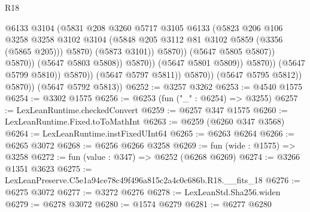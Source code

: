 \begin{lexlean}{R18}
\begin{coremodule}
                                              @6133
                                              @3104
                                              (@5831
                                                @208
                                                @3260
                                                @5717
                                                @3105
                                                @6133
                                                (@5823
                                                  @206
                                                  @106
                                                  @3258
                                                  @3258
                                                  @3102
                                                  @3104
                                                  (@5848
                                                    @205
                                                    @3112
                                                    @81
                                                    @3102
                                                    @5859
                                                    (@3356 (@5865 @205)))
                                                  @5870)
                                                (@5873 @3101))
                                              @5870))
                                          (@5647 @5805 @5807))
                                        @5870))
                                    (@5647 @5803 @5808))
                                  @5870))
                              (@5647 @5801 @5809))
                            @5870))
                        (@5647 @5799 @5810))
                      @5870))
                  (@5647 @5797 @5811))
                @5870))
            (@5647 @5795 @5812))
          @5870))
      (@5647 @5792 @5813))
@6252 := @3257 @3262
@6253 := @4540 @1575
@6254 := @3302 @1575
@6256 := @6253 (fun ("_" : @6254) => @3255)
@6257 := LexLeanRuntime.checkedConvert
@6259 := @6257 @347 @1575
@6260 := LexLeanRuntime.Fixed.toToMathInt
@6263 := @6259 (@6260 @347 @3568)
@6264 := LexLeanRuntime.instFixedUInt64
@6265 := @6263 @6264
@6266 := @6265 @3072
@6268 := @6256 @6266 @3258
@6269 := fun (wide : @1575) => @3258
@6272 := fun (value : @347) => @6252 (@6268 @6269)
@6274 := @3266 @1351 @3623
@6275 := LexLeanPreserve.C5e1a94ce78c49f496a815c2a4c0c686b.R18.__fits_18
@6276 := @6275 @3072
@6277 := @3272 @6276
@6278 := LexLeanStd.Sha256.widen
@6279 := @6278 @3072
@6280 := @1574 @6279
@6281 := @6277 @6280

\end{coremodule}
\end{lexlean}
